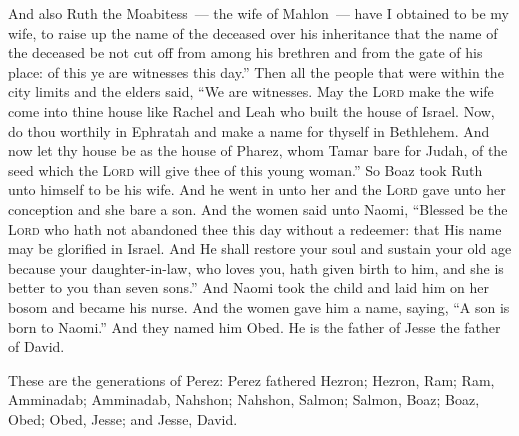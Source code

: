\begin{inparaenum}
     And also Ruth the Moabitess~--- the wife of Mahlon~--- have I obtained to be my wife, to raise up the name of the deceased over his inheritance that the name of the deceased be not cut off from among his brethren and from the gate of his place: of this ye are witnesses this day.''%
     Then all the people that were within the city limits and the elders said, ``We are witnesses. May the \textsc{Lord} make the wife come into thine house like Rachel and Leah who built the house of Israel. Now, do thou worthily in Ephratah and make a name for thyself in Bethlehem.%
     And now let thy house be as the house of Pharez, whom Tamar bare for Judah, of the seed which the \textsc{Lord} will give thee of this young woman.''%
     So Boaz took Ruth unto himself to be his wife. And he went in unto her and the \textsc{Lord} gave unto her conception and she bare a son.%
     And the women said unto Naomi, ``Blessed be the \textsc{Lord} who hath not abandoned thee this day without a redeemer: that His name may be glorified in Israel.%
     And He shall restore your soul and sustain your old age because your daughter-in-law, who loves you, hath given birth to him, and she is better to you than seven sons.''%
     And Naomi took the child and laid him on her bosom and became his nurse.%
     And the women gave him a name, saying, ``A son is born to Naomi.'' And they named him Obed. He is the father of Jesse the father of David.%
    
     These are the generations of Perez: Perez fathered Hezron;%
     Hezron, Ram; Ram, Amminadab;%
     Amminadab, Nahshon; Nahshon, Salmon;%
     Salmon, Boaz; Boaz, Obed;%
     Obed, Jesse; and Jesse, David.%
\end{inparaenum}
